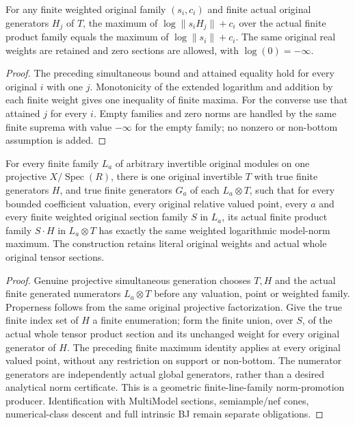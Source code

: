\begin{corollary}
\label{cor:seven-general-original-weighted-finite-product}
\leanok
{}
For any finite weighted original family $(s_i,c_i)$ and finite actual
original generators $H_j$ of $T$, the maximum of
$\log\lVert s_iH_j\rVert+c_i$ over the actual finite product family equals
the maximum of $\log\lVert s_i\rVert+c_i$. The same original real weights
are retained and zero sections are allowed, with $\log(0)=-\infty$.
\end{corollary}
\begin{proof}
The preceding simultaneous bound and attained equality hold for every
original $i$ with one $j$. Monotonicity of the extended logarithm and
addition by each finite weight gives one inequality of finite maxima.
For the converse use that attained $j$ for every $i$. Empty families and
zero norms are handled by the same finite suprema with value $-\infty$
for the empty family; no nonzero or non-bottom assumption is added.
\end{proof}

\begin{theorem}
\label{thm:seven-general-finite-family-weighted-promotion}
\leanok
{}
For every finite family $L_a$ of arbitrary invertible original modules
on one projective $X/\operatorname{Spec}(R)$, there is one original
invertible $T$ with true finite generators $H$, and true finite generators
$G_a$ of each $L_a\otimes T$, such that for every bounded coefficient
valuation, every original relative valued point, every $a$ and every
finite weighted original section family $S$ in $L_a$, its actual finite
product family $S\cdot H$ in $L_a\otimes T$ has exactly the same weighted
logarithmic model-norm maximum. The construction retains literal
original weights and actual whole original tensor sections.
\end{theorem}
\begin{proof}
Genuine projective simultaneous generation chooses $T,H$ and the actual
finite generated numerators $L_a\otimes T$ before any valuation, point or
weighted family. Properness follows from the same original projective
factorization. Give the true finite index set of $H$ a finite enumeration;
form the finite union, over $S$, of the actual whole tensor product
section and its unchanged weight for every original generator of $H$.
The preceding finite maximum identity applies at every original valued
point, without any restriction on support or non-bottom. The numerator
generators are independently actual global generators, rather than a
desired analytical norm certificate. This is a geometric finite-line-family
norm-promotion producer. Identification with MultiModel sections,
semiample/nef cones, numerical-class descent and full intrinsic BJ
remain separate obligations.
\end{proof}


